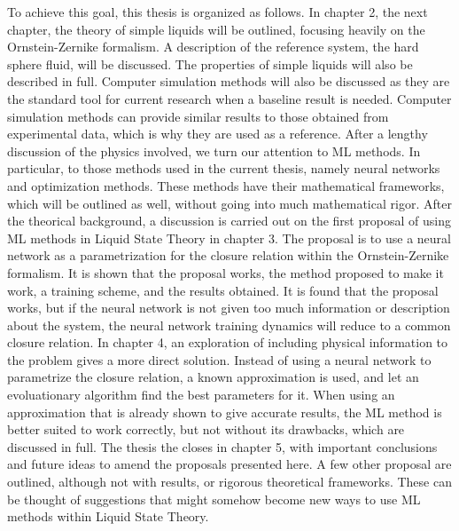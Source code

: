 To achieve this goal, this thesis is organized as follows. In chapter 2, the next chapter,
the theory of simple liquids will be outlined, focusing heavily on the Ornstein-Zernike
formalism. A description of the reference system, the hard sphere fluid, will be discussed.
The properties of simple liquids will also be described in full. Computer simulation
methods will also be discussed as they are the standard tool for current research when
a baseline result is needed. Computer simulation methods can provide similar results to 
those obtained from experimental data, which is why they are used as a reference.
After a lengthy discussion of the physics involved, we turn our attention to ML methods.
In particular, to those methods used in the current thesis, namely neural networks and
optimization methods. These methods have their mathematical frameworks, which will be
outlined as well, without going into much mathematical rigor.
After the theorical background, a discussion is carried out on the first proposal of using 
ML methods in
Liquid State Theory in chapter 3. The proposal is to use a neural network as a 
parametrization for the closure relation within the Ornstein-Zernike formalism.
It is shown that the proposal works, the method proposed to make it work, a training
scheme, and the results obtained. It is found that the proposal works, but if the neural
network is not given too much information or description about the system, the neural
network training dynamics will reduce to a common closure relation.
In chapter 4, an exploration of including physical information to the problem gives
a more direct solution. Instead of using a neural network to parametrize the closure
relation, a known approximation is used, and let an evoluationary algorithm find the
best parameters for it. When using an approximation that is already shown to give
accurate results, the ML method is better suited to work correctly, but not without
its drawbacks, which are discussed in full.
The thesis the closes in chapter 5, with important conclusions and future ideas
to amend the proposals presented here. A few other proposal are outlined, although
not with results, or rigorous theoretical frameworks. These can be thought of
suggestions that might somehow become new ways to use ML methods within Liquid
State Theory.
